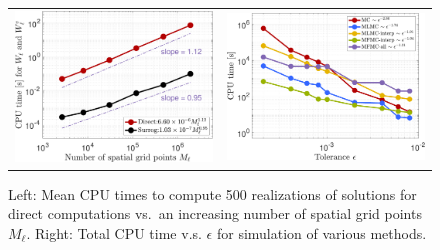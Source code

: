 %
\begin{table}[ht]
\centering
{}
\caption{The number of spatial grid points $M_\ell$, cost per sample for both direct computation $W_\ell$ and surrogate evaluation $W_\ell^e$ at an increasing spatial grid level $\ell = 0$ to 5.}
\label{Tab:Dof}
\end{table}
%

%
\begin{figure}[ht!]\centering
\begin{tabular}{cc}
\includegraphics[width=0.46\linewidth]{./figures/CostPerSample_Ml.pdf}&
\includegraphics[width=0.46\linewidth]{./figures/Cost_epsilon.pdf}
\end{tabular}
\caption{Left:  Mean CPU times to compute 500 realizations of solutions for direct computations vs.\ an increasing number of spatial grid points $M_\ell$. Right:  Total CPU time v.s. $\epsilon$ for simulation of various methods.}
\label{fig:CostEstimatePlot}
\end{figure}
%


